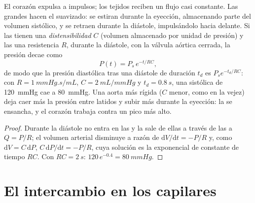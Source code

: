 \begin{theorem}\label{thm:b2:blood-circulation:windkessel}
El corazón expulsa a impulsos; los tejidos reciben un flujo casi
constante. Las grandes  hacen el suavizado: se estiran durante la
eyección, almacenando parte del volumen sistólico, y se retraen durante la
diástole, impulsándolo hacia delante. Si las  tienen una
\emph{distensibilidad} $C$ (volumen almacenado por unidad de presión) y las
 una resistencia $R$, durante la diástole, con la válvula
aórtica cerrada, la presión decae como
\[
P(t) = P_{s}\,e^{-t/RC},
\]
de modo que la presión diastólica tras una diástole de duración $t_d$
es $P_s e^{-t_d/RC}$: con $R = \qty{1}{mmHg.s/mL}$, $C =
\qty{2}{mL/mmHg}$ y $t_d = \qty{0.8}{s}$, una sistólica de
\qty{120}{mmHg} cae a \qty{80}{mmHg}. Una aorta más rígida ($C$ menor, como
en la vejez) deja caer más la presión entre latidos y subir más durante la
eyección: la \emph{} se ensancha, y el corazón trabaja
contra un pico más alto.
\end{theorem}
\begin{proof}
Durante la diástole no entra  en las  y la  sale de
ellas a través de las  a $Q = P/R$; el volumen arterial
disminuye a razón de $\mathrm{d}V/\mathrm{d}t = -P/R$ y, como $\mathrm{d}V = C\,
\mathrm{d}P$, $C\,\mathrm{d}P/\mathrm{d}t = -P/R$, cuya solución es la
exponencial de constante de tiempo $RC$. Con $RC = \qty{2}{s}$:
$120\,e^{-0.4} = \qty{80}{mmHg}$.
\end{proof}

\section{El intercambio en los capilares}

